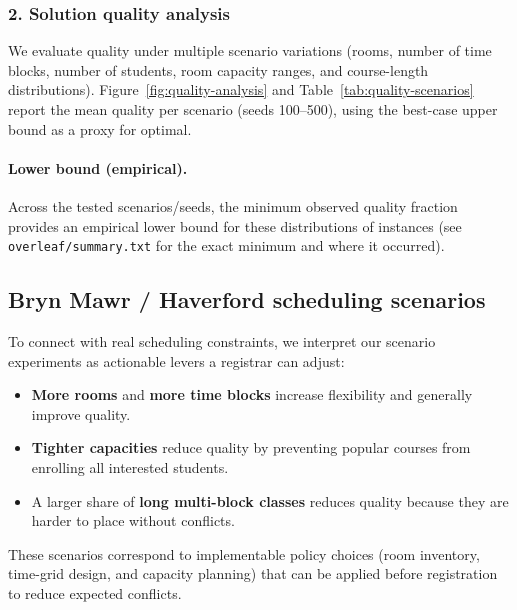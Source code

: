 


\subsubsection*{2. Solution quality analysis}
We evaluate quality under multiple scenario variations (rooms, number of time blocks, number of students, room capacity ranges, and course-length distributions). Figure~\ref{fig:quality-analysis} and Table~\ref{tab:quality-scenarios} report the mean quality per scenario (seeds 100--500), using the best-case upper bound as a proxy for optimal.




\paragraph{Lower bound (empirical).}
Across the tested scenarios/seeds, the minimum observed quality fraction provides an empirical lower bound for these distributions of instances (see \texttt{overleaf/summary.txt} for the exact minimum and where it occurred).

\subsection{Bryn Mawr / Haverford scheduling scenarios}\label{sec:bmc-hc}
To connect with real scheduling constraints, we interpret our scenario experiments as actionable levers a registrar can adjust:
\begin{itemize}
  \item \textbf{More rooms} and \textbf{more time blocks} increase flexibility and generally improve quality.
  \item \textbf{Tighter capacities} reduce quality by preventing popular courses from enrolling all interested students.
  \item A larger share of \textbf{long multi-block classes} reduces quality because they are harder to place without conflicts.
\end{itemize}
These scenarios correspond to implementable policy choices (room inventory, time-grid design, and capacity planning) that can be applied before registration to reduce expected conflicts.

